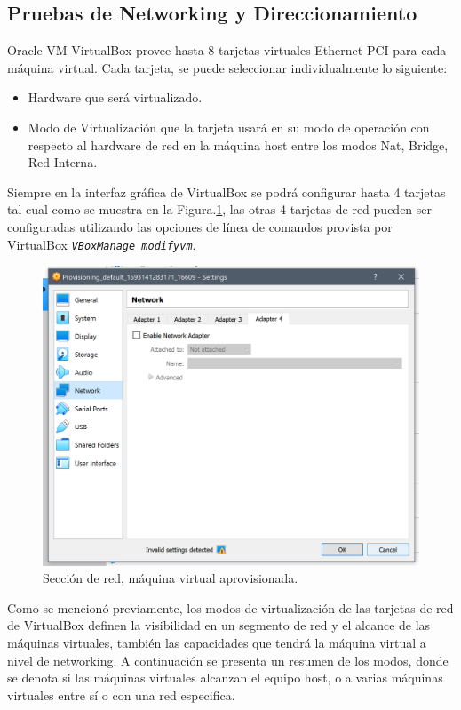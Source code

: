 \documentclass[letterpaper, 12pt, oneside]{article}
\begin{document}
    \subsection{Pruebas de Networking y Direccionamiento}
    Oracle VM VirtualBox provee hasta 8 tarjetas virtuales Ethernet PCI para cada máquina virtual. Cada tarjeta, se puede seleccionar individualmente lo siguiente: 
    \begin{itemize}
        \item Hardware que será virtualizado.
        \item Modo de Virtualización que la tarjeta usará en su modo de operación con respecto al hardware de red en la máquina host entre los modos Nat, Bridge, Red Interna.
    \end{itemize}
    
    Siempre en la interfaz gráfica de VirtualBox se podrá configurar hasta 4 tarjetas tal cual como se muestra en la Figura.\ref{fig:net1}, las otras 4 tarjetas de red pueden ser configuradas utilizando las opciones de línea de comandos provista por VirtualBox \textit{\texttt{VBoxManage modifyvm}}\cite{vbnet1}.
    
    \begin{figure}[H]
        \includegraphics[scale=0.8]{img/networking/networking1.png}
        \caption{Sección de red, máquina virtual aprovisionada.}
        \label{fig:net1}
    \end{figure}
    Como se mencionó previamente, los modos de virtualización de las tarjetas de red de VirtualBox definen la visibilidad en un segmento de red y el alcance de las máquinas virtuales, también las capacidades que tendrá la máquina virtual a nivel de networking. A continuación se presenta un resumen de los modos, donde se denota si las máquinas virtuales alcanzan el equipo host, o a varias máquinas virtuales entre sí o con una red especifica.
    
\end{document}
